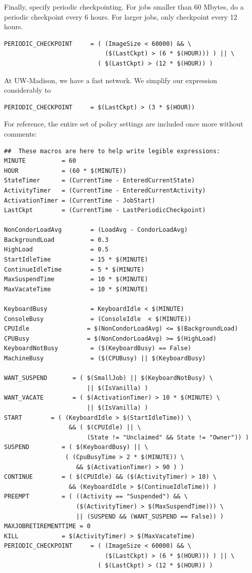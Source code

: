 Finally, specify periodic checkpointing.  
For jobs smaller than 60 Mbytes, do a periodic checkpoint every 6 hours.  
For larger jobs, only checkpoint every 12 hours.
\begin{verbatim}
PERIODIC_CHECKPOINT     = ( (ImageSize < 60000) && \
                            ($(LastCkpt) > (6 * $(HOUR))) ) || \ 
                          ( $(LastCkpt) > (12 * $(HOUR)) )
\end{verbatim}


At UW-Madison, we have a fast network.
We simplify our expression considerably to
\begin{verbatim}
PERIODIC_CHECKPOINT     = $(LastCkpt) > (3 * $(HOUR))
\end{verbatim}

For reference, the entire set of policy settings are included
once more without comments:

\begin{verbatim}
##  These macros are here to help write legible expressions:
MINUTE          = 60
HOUR            = (60 * $(MINUTE))
StateTimer      = (CurrentTime - EnteredCurrentState)
ActivityTimer   = (CurrentTime - EnteredCurrentActivity)
ActivationTimer = (CurrentTime - JobStart)
LastCkpt        = (CurrentTime - LastPeriodicCheckpoint)

NonCondorLoadAvg        = (LoadAvg - CondorLoadAvg)
BackgroundLoad          = 0.3
HighLoad                = 0.5
StartIdleTime           = 15 * $(MINUTE)
ContinueIdleTime        = 5 * $(MINUTE)
MaxSuspendTime          = 10 * $(MINUTE)
MaxVacateTime           = 10 * $(MINUTE)

KeyboardBusy            = KeyboardIdle < $(MINUTE)
ConsoleBusy             = (ConsoleIdle  < $(MINUTE))
CPUIdle                = $(NonCondorLoadAvg) <= $(BackgroundLoad)
CPUBusy                = $(NonCondorLoadAvg) >= $(HighLoad)
KeyboardNotBusy         = ($(KeyboardBusy) == False)
MachineBusy             = ($(CPUBusy) || $(KeyboardBusy)

WANT_SUSPEND       = ( $(SmallJob) || $(KeyboardNotBusy) \
                       || $(IsVanilla) )
WANT_VACATE        = ( $(ActivationTimer) > 10 * $(MINUTE) \
                       || $(IsVanilla) )
START        = ( (KeyboardIdle > $(StartIdleTime)) \
                  && ( $(CPUIdle) || \
                       (State != "Unclaimed" && State != "Owner")) )
SUSPEND         = ( $(KeyboardBusy) || \
                 ( (CpuBusyTime > 2 * $(MINUTE)) \
                    && $(ActivationTimer) > 90 ) )
CONTINUE        = ( $(CPUIdle) && ($(ActivityTimer) > 10) \
                  && (KeyboardIdle > $(ContinueIdleTime)) )
PREEMPT	        = ( ((Activity == "Suspended") && \
                    ($(ActivityTimer) > $(MaxSuspendTime))) \
                    || (SUSPEND && (WANT_SUSPEND == False)) )
MAXJOBRETIREMENTTIME = 0
KILL            = $(ActivityTimer) > $(MaxVacateTime)
PERIODIC_CHECKPOINT     = ( (ImageSize < 60000) && \
                            ($(LastCkpt) > (6 * $(HOUR))) ) || \ 
                          ( $(LastCkpt) > (12 * $(HOUR)) )
\end{verbatim}

